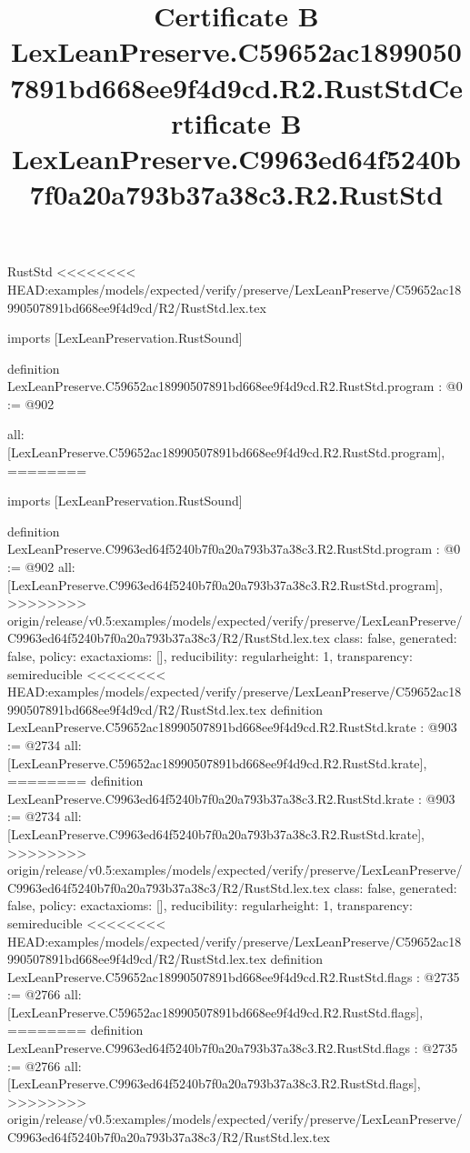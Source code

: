 \begin{lexlean}{RustStd}
<<<<<<<< HEAD:examples/models/expected/verify/preserve/LexLeanPreserve/C59652ac18990507891bd668ee9f4d9cd/R2/RustStd.lex.tex
\title{Certificate B LexLeanPreserve.C59652ac18990507891bd668ee9f4d9cd.R2.RustStd}
\begin{coremodule}
imports [LexLeanPreservation.RustSound]

definition LexLeanPreserve.C59652ac18990507891bd668ee9f4d9cd.R2.RustStd.program : @0 := @902 {
  all: [LexLeanPreserve.C59652ac18990507891bd668ee9f4d9cd.R2.RustStd.program],
========
\title{Certificate B LexLeanPreserve.C9963ed64f5240b7f0a20a793b37a38c3.R2.RustStd}
\begin{coremodule}
imports [LexLeanPreservation.RustSound]

definition LexLeanPreserve.C9963ed64f5240b7f0a20a793b37a38c3.R2.RustStd.program : @0 := @902 {
  all: [LexLeanPreserve.C9963ed64f5240b7f0a20a793b37a38c3.R2.RustStd.program],
>>>>>>>> origin/release/v0.5:examples/models/expected/verify/preserve/LexLeanPreserve/C9963ed64f5240b7f0a20a793b37a38c3/R2/RustStd.lex.tex
  class: false,
  generated: false,
  policy: exact{axioms: []},
  reducibility: regular{height: 1},
  transparency: semireducible
}
<<<<<<<< HEAD:examples/models/expected/verify/preserve/LexLeanPreserve/C59652ac18990507891bd668ee9f4d9cd/R2/RustStd.lex.tex
definition LexLeanPreserve.C59652ac18990507891bd668ee9f4d9cd.R2.RustStd.krate : @903 := @2734 {
  all: [LexLeanPreserve.C59652ac18990507891bd668ee9f4d9cd.R2.RustStd.krate],
========
definition LexLeanPreserve.C9963ed64f5240b7f0a20a793b37a38c3.R2.RustStd.krate : @903 := @2734 {
  all: [LexLeanPreserve.C9963ed64f5240b7f0a20a793b37a38c3.R2.RustStd.krate],
>>>>>>>> origin/release/v0.5:examples/models/expected/verify/preserve/LexLeanPreserve/C9963ed64f5240b7f0a20a793b37a38c3/R2/RustStd.lex.tex
  class: false,
  generated: false,
  policy: exact{axioms: []},
  reducibility: regular{height: 1},
  transparency: semireducible
}
<<<<<<<< HEAD:examples/models/expected/verify/preserve/LexLeanPreserve/C59652ac18990507891bd668ee9f4d9cd/R2/RustStd.lex.tex
definition LexLeanPreserve.C59652ac18990507891bd668ee9f4d9cd.R2.RustStd.flags : @2735 := @2766 {
  all: [LexLeanPreserve.C59652ac18990507891bd668ee9f4d9cd.R2.RustStd.flags],
========
definition LexLeanPreserve.C9963ed64f5240b7f0a20a793b37a38c3.R2.RustStd.flags : @2735 := @2766 {
  all: [LexLeanPreserve.C9963ed64f5240b7f0a20a793b37a38c3.R2.RustStd.flags],
>>>>>>>> origin/release/v0.5:examples/models/expected/verify/preserve/LexLeanPreserve/C9963ed64f5240b7f0a20a793b37a38c3/R2/RustStd.lex.tex
}}}
\end{coremodule}}
\end{coremodule}
\end{lexlean}
